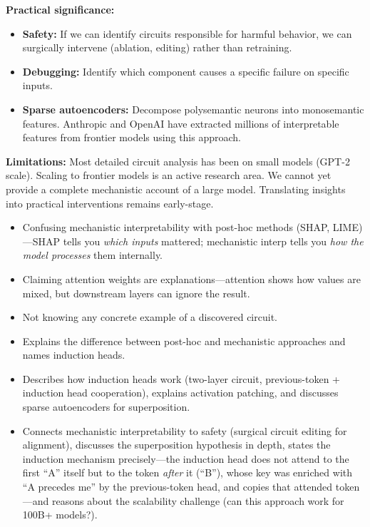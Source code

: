 \begin{interviewq}
\textbf{Practical significance:}
\begin{itemize}
    \item \textbf{Safety:} If we can identify circuits responsible for harmful behavior, we can surgically intervene (ablation, editing) rather than retraining.
    \item \textbf{Debugging:} Identify which component causes a specific failure on specific inputs.
    \item \textbf{Sparse autoencoders:} Decompose polysemantic neurons into monosemantic features. Anthropic and OpenAI have extracted millions of interpretable features from frontier models using this approach.
\end{itemize}

\textbf{Limitations:} Most detailed circuit analysis has been on small models (GPT-2 scale). Scaling to frontier models is an active research area. We cannot yet provide a complete mechanistic account of a large model. Translating insights into practical interventions remains early-stage.

\redflags
\begin{itemize}
    \item Confusing mechanistic interpretability with post-hoc methods (SHAP, LIME)---SHAP tells you \textit{which inputs} mattered; mechanistic interp tells you \textit{how the model processes} them internally.
    \item Claiming attention weights are explanations---attention shows how values are mixed, but downstream layers can ignore the result.
    \item Not knowing any concrete example of a discovered circuit.
\end{itemize}


\goodgreat
\begin{itemize}
    \item {} Explains the difference between post-hoc and mechanistic approaches and names induction heads.
    \item {} Describes how induction heads work (two-layer circuit, previous-token + induction head cooperation), explains activation patching, and discusses sparse autoencoders for superposition.
    \item {} Connects mechanistic interpretability to safety (surgical circuit editing for alignment), discusses the superposition hypothesis in depth, states the induction mechanism precisely---the induction head does not attend to the first ``A'' itself but to the token \textit{after} it (``B''), whose key was enriched with ``A precedes me'' by the previous-token head, and copies that attended token---and reasons about the scalability challenge (can this approach work for 100B+ models?).
\end{itemize}


\end{interviewq}
